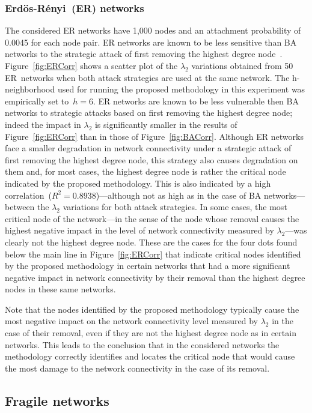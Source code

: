 \documentclass[conference,fleqn]{IEEEtran}
\begin{document}
\subsubsection{Erd\"{o}s-R\'{e}nyi~(ER) networks}
The considered ER networks have 1,000 nodes and an attachment probability of 0.0045 for each node pair.
ER networks are known to be less sensitive than BA networks to the strategic attack of first removing the highest degree node~\cite{Albert2000a}.
Figure~\ref{fig:ERCorr} shows a scatter plot of the $\lambda_2$ variations obtained from 50 ER~networks when
both attack strategies are used at the same network. 
The h-neighborhood used for running the proposed methodology in this experiment was 
empirically set to~$h=6$. ER networks are known to be less vulnerable then BA networks to strategic attacks
based on first removing the highest degree node; indeed the impact in $\lambda_2$ is significantly smaller
in the results of Figure~\ref{fig:ERCorr} than in those of Figure~\ref{fig:BACorr}. Although ER networks
face a smaller degradation in network connectivity under a strategic attack of first removing the
highest degree node, this strategy also causes degradation on them and, for most cases, the highest
degree node is rather the critical node indicated by the proposed methodology. This is also indicated by a high correlation~($R^2=0.8938$)---although
not as high as in the case of BA networks---between the $\lambda_2$ variations for both attack strategies. In some cases,
the most critical node of the network---in the sense of the node whose removal causes the highest negative impact
in the level of network connectivity measured by $\lambda_2$---was clearly not the highest degree node. These are
the cases for the four dots found below the main line in Figure~\ref{fig:ERCorr} that indicate critical nodes identified
by the proposed methodology in certain networks that had a more significant negative impact in network connectivity
by their removal than the highest degree nodes in these same networks.


Note that the nodes identified by the proposed methodology typically cause the most negative impact on the network connectivity 
level measured by $\lambda_2$ in the case of their removal, even if they are not the highest degree node as in certain networks.
This leads to the conclusion that in the considered networks the methodology correctly identifies and locates
the critical node that would cause the most damage to the network connectivity in the case of its removal.

\subsection{Fragile networks}
\label{subsec:fragile}
\end{document}
